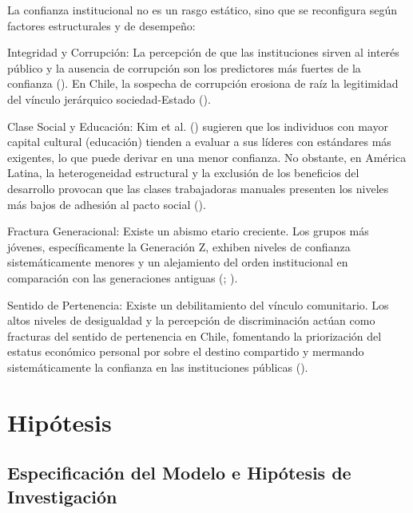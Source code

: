 \documentclass[
  spanish,
  a4paper,
  oneside]{scrbook}
\begin{document}
La confianza institucional no es un rasgo estático, sino que se
reconfigura según factores estructurales y de desempeño:

Integridad y Corrupción: La percepción de que las instituciones sirven
al interés público y la ausencia de corrupción son los predictores más
fuertes de la confianza (). En Chile, la sospecha
de corrupción erosiona de raíz la legitimidad del vínculo jerárquico
sociedad-Estado
().

Clase Social y Educación: Kim et al. () sugieren que los individuos con mayor capital cultural
(educación) tienden a evaluar a sus líderes con estándares más
exigentes, lo que puede derivar en una menor confianza. No obstante, en
América Latina, la heterogeneidad estructural y la exclusión de los
beneficios del desarrollo provocan que las clases trabajadoras manuales
presenten los niveles más bajos de adhesión al pacto social
().

Fractura Generacional: Existe un abismo etario creciente. Los grupos más
jóvenes, específicamente la Generación Z, exhiben niveles de confianza
sistemáticamente menores y un alejamiento del orden institucional en
comparación con las generaciones antiguas
(; ).

Sentido de Pertenencia: Existe un debilitamiento del vínculo
comunitario. Los altos niveles de desigualdad y la percepción de
discriminación actúan como fracturas del sentido de pertenencia en
Chile, fomentando la priorización del estatus económico personal por
sobre el destino compartido y mermando sistemáticamente la confianza en
las instituciones públicas ().


\chapter{Hipótesis}\label{hipuxf3tesis}

\section{Especificación del Modelo e Hipótesis de
Investigación}\label{especificaciuxf3n-del-modelo-e-hipuxf3tesis-de-investigaciuxf3n}
\end{document}

